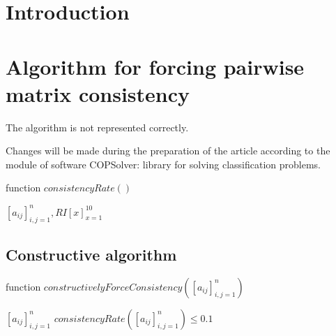 \documentclass[authoryear,manuscript,12pt]{elsarticle}
\begin{document}
\section{Introduction}
\label{sec:intro}

\section{Algorithm for forcing pairwise matrix consistency}

The algorithm is not represented correctly. 

Changes will be made during the preparation of the article according to the module of software COPSolver: library for solving classification problems.

\begin{algorithm}
\caption{function $consistencyRate()$}\label{alg:CA}
\begin{algorithmic}
\Require $[a_{ij}]_{i,j=1}^{n}, RI[x]_{x=1}^{10}$
\end{algorithmic}
\end{algorithm}

\subsection{Constructive algorithm}

\begin{algorithm}
\caption{function $constructivelyForceConsistency([a_{ij}]_{i,j=1}^{n})$}\label{alg:CA}
\begin{algorithmic}
\Require $[a_{ij}]_{i,j=1}^{n}$
\Ensure $consistencyRate([a_{ij}]_{i,j=1}^{n}) \leq 0.1$
\Else
		\EndIf
	\EndFor
\EndIf
{}

\end{algorithmic}
\end{algorithm}
\end{document}
